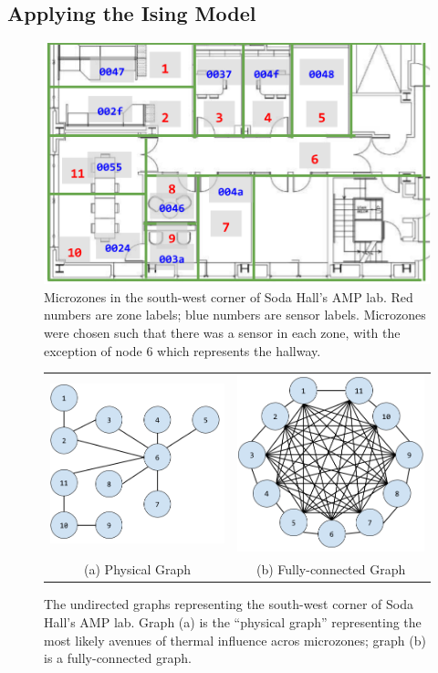 \subsection{Applying the Ising Model}

\begin{figure}
\centering
\includegraphics[width=.5\linewidth]{figs/Soda_AMP_microzones}
\caption{Microzones in the south-west corner of Soda Hall's AMP lab. Red numbers are zone labels; blue numbers are sensor labels. Microzones were chosen such that there was a sensor in each zone, with the exception of node 6 which represents the hallway.}
\label{fig:soda_amp_microzones}
\end{figure}

\begin{figure}
\centering
\begin{tabular}{cc}
\includegraphics[width=.4\linewidth]{figs/SodaEdgeGraph} & \includegraphics[width=.4\linewidth]{figs/SodaFullEdgeGraph} \\
(a) Physical Graph  & (b) Fully-connected Graph \\[6pt]
\end{tabular}
\caption{The undirected graphs representing the south-west corner of Soda Hall's AMP lab. Graph (a) is the ``physical graph'' representing the most likely avenues of thermal influence acros microzones; graph (b) is a fully-connected graph.}
\label{fig:soda_edges}
\end{figure}

